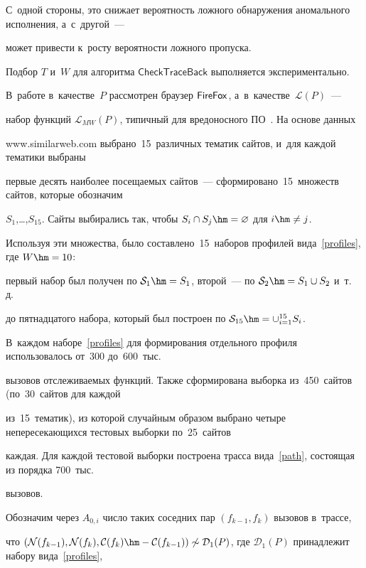 С~одной стороны, это снижает ве\-ро\-ят\-ность лож\-но\-го обнаружения аномального исполнения, а~с~другой~--- 

может привести к~росту вероятности лож\-но\-го пропуска. 



Подбор $T$ и~$W$ для алгоритма $\textsf{CheckTraceBack}$ выполняется экспериментально. 

В~работе в~качестве~$P$ рассмотрен браузер ${\sf FireFox}$, а~в~качестве~$\mathcal{L}(P)$~--- 

набор функций $\mathcal{L}_{MW}(P)$, типичный для вредоносного ПО~\cite{Gupta2018}. На основе данных 

{\sf www.similarweb.com} выбрано~15~различных тематик сайтов, и~для каждой тематики выбраны 

первые десять наиболее посещаемых сайтов~--- сформировано~15~множеств сайтов, которые обозначим 

$S_1$,\ldots,$S_{15}$. Сайты выбирались так, чтобы $S_i\cap S_j\hm=\varnothing$ для $i\hm\neq j$. 

Используя эти множества, было составлено~15~наборов профилей вида~\eqref{profiles}, где $W\hm=10$: 

первый набор был получен по $\mathcal{S}_1\hm=S_1$, второй~--- по $\mathcal{S}_2\hm=S_1\cup S_2$ и~т.\,д.\

 до пятнадцатого набора, который был построен по $\mathcal{S}_{15}\hm=\cup_{i=1}^{15}S_i$. 

 В~каждом наборе~\eqref{profiles} для формирования отдельного профиля использовалось от~300 до~600~тыс.\

  вызовов отслеживаемых функций. Также сформирована выборка из~450~сай\-тов (по~30~сайтов для каждой 

  из~15~тематик), из которой случайным образом выбрано четыре непересекающихся тестовых выборки по~25~сайтов 

  каждая. Для каждой тес\-то\-вой выборки построена трас\-са вида~\eqref{path}, состоящая из порядка 700~тыс.\

   вызовов. 

   

   



Обозначим через $A_{0,i}$ число таких соседних пар $(f_{k-1},f_{k})$ вызовов в~трассе, 

что $(\mathcal{N}(f_{k-1}),\mathcal{N}(f_{k}), \mathcal{C}(f_{k})\hm-\mathcal{C}(f_{k-1}))\not\sim 

\mathcal{D}_1(P)$, где $\mathcal{D}_1(P)$ принадлежит набору вида~\eqref{profiles}, 

